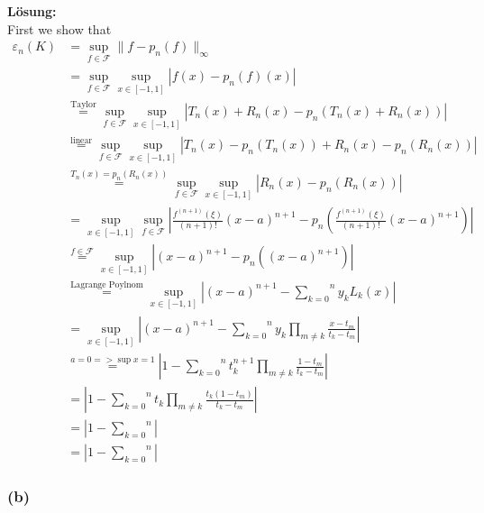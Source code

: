 \documentclass[11pt,a4paper,ngerman]{article}
\begin{document}
\textbf{Lösung:}\\
First we show that
\begin{equation*}\begin{split}
    \varepsilon_n(K)
    &= \underset{f \in \mathcal{F}}{\sup} \| f - p_n(f) \|_\infty\\
    &= \underset{f \in \mathcal{F}}{\sup}
        \underset{x \in [-1,1]}{\sup} | f (x) - p_n(f)(x) |\\
    &\stackrel{\text{Taylor}}{=} \underset{f \in \mathcal{F}}{\sup}
        \underset{x \in [-1,1]}{\sup} | T_n(x) + R_n(x) - p_n(T_n(x) + R_n(x)) |\\
    &\stackrel{\text{linear}}{=}\underset{f \in \mathcal{F}}{\sup} \underset{x \in [-1,1]}{\sup} | T_n(x) - p_n(T_n(x)) + R_n(x) - p_n(R_n(x)) |\\
    &\stackrel{T_n(x)=p_n(R_n(x))}{=} \underset{f \in \mathcal{F}}{\sup}\underset{x \in [-1,1]}{\sup} | R_n(x) - p_n(R_n(x)) | \\
    &= \underset{x \in [-1,1]}{\sup} \underset{f \in \mathcal{F}}{\sup}| \frac{f^{(n+1)}(\xi)}{(n+1)!} (x-a)^{n+1} - p_n(\frac{f^{(n+1)}(\xi)}{(n+1)!} (x-a)^{n+1}) |\\
    &\stackrel{f \in \mathcal{F}}{=} \underset{x \in [-1,1]}{\sup} | (x-a)^{n+1} - p_n((x-a)^{n+1}) |\\
    &\stackrel{\text{Lagrange Poylnom}}{=}
        \underset{x \in [-1,1]}{\sup}
    \left| (x-a)^{n+1} - \overset{n}{\underset{k=0}{\sum}} y_k L_k(x) \right|\\     
    &= \underset{x \in [-1,1]}{\sup}
     \left| (x-a)^{n+1} - 
    \overset{n}{\underset{k=0}{\sum}} y_k \underset{m \not= k}{\prod}
    \frac{x - t_m}{t_k - t_m} \right|\\
    &\stackrel{a = 0 => \sup x=1}{=}
        \left| 1 - \overset{n}{\underset{k=0}{\sum}} t_k^{n+1}
        \underset{m \not= k}{\prod} \frac{1 - t_m}{t_k - t_m} \right| \\
    &= \left| 1 - \overset{n}{\underset{k=0}{\sum}} t_k
        \underset{m \not= k}{\prod} \frac{t_k(1-t_m)}{t_k - t_m} \right| \\
    &= \left| 1 - \overset{n}{\underset{k=0}{\sum}} 
         \right|\\
    &= \left| 1 - \overset{n}{\underset{k=0}{\sum}}  \right|
\end{split}\end{equation*}

\subsubsection*{(b)}
\end{document}
